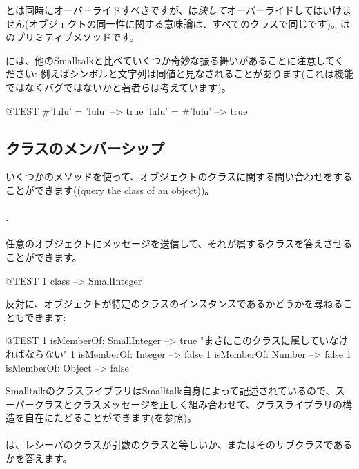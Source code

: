 \documentclass[a4paper,10pt,twoside]{book}
\begin{document}
\ct{=}とは同時にオーバーライドすべきですが、\ct{==}は\emph{決して}オーバーライドしてはいけません(オブジェクトの同一性に関する意味論は、すべてのクラスで同じです)。\ct{==}はのプリミティブメソッドです。

\pharo には、他のSmalltalkと比べていくつか奇妙な振る舞いがあることに注意してください: 例えばシンボルと文字列は同値と見なされることがあります(これは機能ではなくバグではないかと著者らは考えています)。

\begin{code}{@TEST}
#'lulu' = 'lulu' --> true
'lulu' = #'lulu' --> true
\end{code}


\subsection{クラスのメンバーシップ}
いくつかのメソッドを使って、オブジェクトのクラスに関する問い合わせをすることができます((query the class of an object))。

\paragraph{.} 任意のオブジェクトにメッセージを送信して、それが属するクラスを答えさせることができます。
\begin{code}{@TEST}
1 class --> SmallInteger
\end{code}

反対に、オブジェクトが特定のクラスのインスタンスであるかどうかを尋ねることもできます:
\begin{code}{@TEST}
1 isMemberOf: SmallInteger --> true    "まさにこのクラスに属していなければならない"
1 isMemberOf: Integer          --> false
1 isMemberOf: Number        --> false
1 isMemberOf: Object           --> false
\end{code}

SmalltalkのクラスライブラリはSmalltalk自身によって記述されているので、スーパークラスとクラスメッセージを正しく組み合わせて、クラスライブラリの構造を自在にたどることができます(を参照)。

\paragraph{}
は、レシーバのクラスが引数のクラスと等しいか、またはそのサブクラスであるかを答えます。
\end{document}
